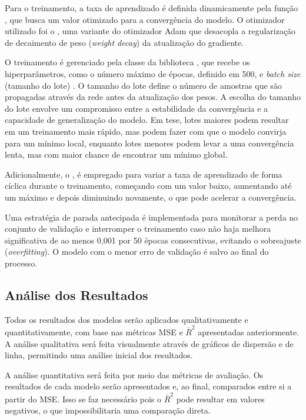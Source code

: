 Para o treinamento, a taxa de aprendizado  é definida dinamicamente pela função , 
que busca um valor otimizado para a convergência do modelo. O otimizador utilizado foi o , uma variante do otimizador 
Adam que desacopla a regularização de decaimento de peso (\textit{weight decay}) da atualização do gradiente.

O treinamento é gerenciado pela classe  da biblioteca , que recebe os hiperparâmetros, 
como o número máximo de épocas, definido em 500, e \textit{batch size} (tamanho do lote) . O tamanho
do lote define o número de amostras que são propagadas através da rede antes da atualização dos pesos. A escolha do tamanho
do lote envolve um compromisso entre a estabilidade da convergência e a capacidade de generalização do modelo. Em tese, 
lotes maiores podem resultar em um treinamento mais rápido, mas podem fazer com que o modelo convirja para um mínimo local, 
enquanto lotes menores podem levar a uma convergência lenta, mas com maior chance de encontrar um mínimo global.

Adicionalmente, o , é empregado para variar a taxa de aprendizado de forma cíclica durante o treinamento, 
começando com um valor baixo, aumentando até um máximo e depois diminuindo novamente, o que pode acelerar a convergência.

Uma estratégia de parada antecipada  é implementada para monitorar a perda no conjunto de validação 
e interromper o treinamento caso não haja melhora significativa de ao menos 0,001 por 50 épocas consecutivas, 
evitando o sobreajuste (\textit{overfitting}). O modelo com o menor erro de validação é salvo ao final do processo.

\subsection{Análise dos Resultados} %
Todos os resultados dos modelos serão aplicados qualitativamente e quantitativamente, com base nas métricas MSE e $\bar{R}^2$
apresentadas anteriormente. A análise qualitativa será feita visualmente através de gráficos de dispersão e de linha, permitindo uma análise inicial
dos resultados.

A análise quantitativa será feita por meio das métricas de avaliação. Os resultados de cada modelo serão apresentados e, ao final,
comparados entre si a partir do MSE. Isso se faz necessário pois o $\bar{R}^2$ pode resultar em valores negativos, o que impossibilitaria
uma comparação direta.